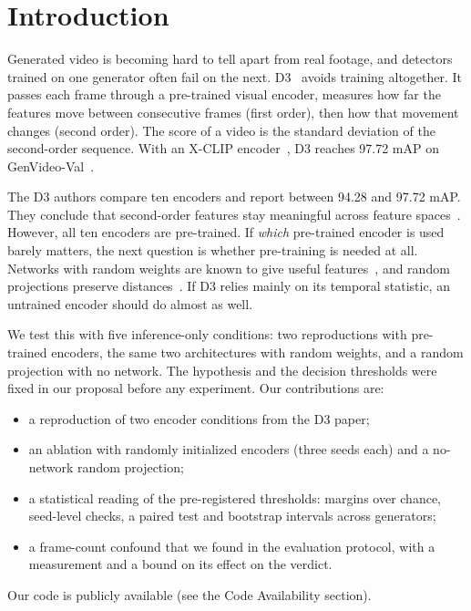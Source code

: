 \documentclass[conference]{IEEEtran}
\begin{document}
\section{Introduction}
\label{sec:intro}

Generated video is becoming hard to tell apart from real footage, and
detectors trained on one generator often fail on the next. D3~\cite{zheng2025d3}
avoids training altogether. It passes each frame through a pre-trained visual
encoder, measures how far the features move between consecutive frames (first
order), then how that movement changes (second order). The score of a video is
the standard deviation of the second-order sequence. With an X-CLIP
encoder~\cite{ni2022xclip}, D3 reaches 97.72 mAP on
GenVideo-Val~\cite{chen2024demamba}.

The D3 authors compare ten encoders and report between 94.28 and 97.72 mAP.
They conclude that second-order features stay meaningful across feature
spaces~\cite[Sec.~5.1]{zheng2025d3}. However, all ten encoders are
pre-trained. If \emph{which} pre-trained encoder is used barely matters, the
next question is whether pre-training is needed at all. Networks with random
weights are known to give useful features~\cite{jarrett2009,saxe2011}, and
random projections preserve distances~\cite{johnson1984}. If D3 relies mainly
on its temporal statistic, an untrained encoder should do almost as well.

We test this with five inference-only conditions: two reproductions with
pre-trained encoders, the same two architectures with random weights, and a
random projection with no network. The hypothesis and the decision thresholds
were fixed in our proposal before any experiment. Our contributions are:
\begin{itemize}
  \item a reproduction of two encoder conditions from the D3 paper;
  \item an ablation with randomly initialized encoders (three seeds each) and
        a no-network random projection;
  \item a statistical reading of the pre-registered thresholds: margins over
        chance, seed-level checks, a paired test and bootstrap intervals
        across generators;
  \item a frame-count confound that we found in the evaluation protocol, with
        a measurement and a bound on its effect on the verdict.
\end{itemize}
Our code is publicly available (see the Code Availability section).
\end{document}
